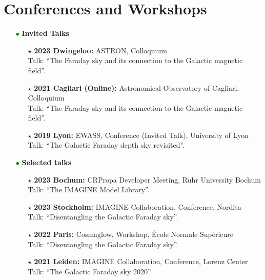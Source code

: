 \documentclass[11pt,a4paper,sans, table, dvipsnames]{moderncv}        %
\begin{document}
\vspace{\baselineskip}
\section{Conferences and Workshops}
\begin{itemize}
\item[\textcolor{Green}{$\bullet$}] {\textbf{Invited Talks}}
  \vspace{0.2\baselineskip}
\begin{itemize}
  \item[\textcolor{Black}{$\star$}]{\textbf{2023 Dwingeloo:} ASTRON, Colloquium\\ Talk: ``The Faraday sky and its connection to the Galactic magnetic field''.}
  \item[\textcolor{Black}{$\star$}]{\textbf{2021 Cagliari (Online):} Astronomical Observatory of Cagliari, Colloquium\\ Talk: ``The Faraday sky and its connection to the Galactic magnetic field''.}
  \item[\textcolor{Black}{$\star$}]{\textbf{2019 Lyon:} EWASS, Conference (Invited Talk), University of Lyon \\ Talk: ``The Galactic Faraday depth sky revisited''.}
\end{itemize}
  \vspace{0.4\baselineskip}
\item[\textcolor{Green}{$\bullet$}] {\textbf{Selected talks}}
  \vspace{0.2\baselineskip}
  \begin{itemize}
    \item[\textcolor{Black}{$\star$}]{\textbf{2023 Bochum:} CRPropa Developer Meeting, Ruhr University Bochum \\ Talk: ``The IMAGINE Model Library''.}
    
    \item[\textcolor{Black}{$\star$}]{\textbf{2023 Stockholm:} IMAGINE Collaboration, Conference, Nordita\\ Talk: ``Disentangling the Galactic Faraday sky''.}

    \item[\textcolor{Black}{$\star$}]{\textbf{2022 Paris:} Cosmaglow, Workshop, École Normale Supérieure\\ Talk: ``Disentangling the Galactic Faraday sky''.}

    \item[\textcolor{Black}{$\star$}]{\textbf{2021 Leiden:} IMAGINE Collaboration, Conference, Lorenz Center\\ Talk: ``The Galactic Faraday sky 2020''.}


\end{itemize}
\end{itemize}
\end{document}

